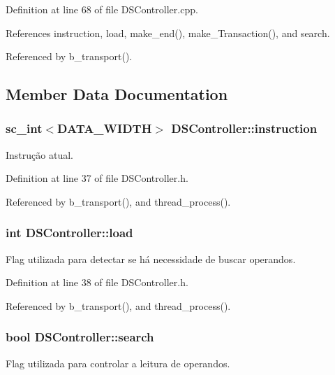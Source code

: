 Definition at line 68 of file D\+S\+Controller.\+cpp.



References instruction, load, make\+\_\+end(), make\+\_\+\+Transaction(), and search.



Referenced by b\+\_\+transport().



\subsection{Member Data Documentation}
\hypertarget{classDSController_afc4cc29171d5dabef923c07556b7f7db}{
\subsubsection[{instruction}]{\setlength{\rightskip}{0pt plus 5cm}sc\+\_\+int$<${\bf D\+A\+T\+A\+\_\+\+W\+I\+D\+T\+H}$>$ D\+S\+Controller\+::instruction\hspace{0.3cm}{\ttfamily [private]}}}\label{classDSController_afc4cc29171d5dabef923c07556b7f7db}
Instrução atual. 

Definition at line 37 of file D\+S\+Controller.\+h.



Referenced by b\+\_\+transport(), and thread\+\_\+process().

\hypertarget{classDSController_a60ba7f65ce563b1125475dd5352ea5ec}{
\subsubsection[{load}]{\setlength{\rightskip}{0pt plus 5cm}int D\+S\+Controller\+::load\hspace{0.3cm}{\ttfamily [private]}}}\label{classDSController_a60ba7f65ce563b1125475dd5352ea5ec}
Flag utilizada para detectar se há necessidade de buscar operandos. 

Definition at line 38 of file D\+S\+Controller.\+h.



Referenced by b\+\_\+transport(), and thread\+\_\+process().

\hypertarget{classDSController_abd0050ab6f0971ad0135d158bdf0f430}{
\subsubsection[{search}]{\setlength{\rightskip}{0pt plus 5cm}bool D\+S\+Controller\+::search\hspace{0.3cm}{\ttfamily [private]}}}\label{classDSController_abd0050ab6f0971ad0135d158bdf0f430}
Flag utilizada para controlar a leitura de operandos. 

